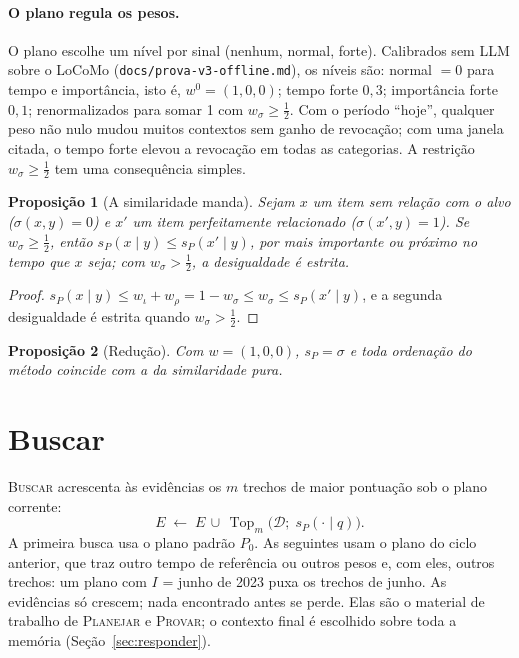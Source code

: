 \documentclass[11pt]{article}
\theoremstyle{definition}
\theoremstyle{plain}
\newtheorem{proposicao}{Proposição}
\newcommand{\op}[1]{\textsc{#1}}
\newcommand{\D}{\mathcal{D}}          %
\newcommand{\Top}{\operatorname{Top}}
\begin{document}
\paragraph{O plano regula os pesos.} O plano escolhe um nível por sinal
(nenhum, normal, forte). Calibrados sem LLM sobre o LoCoMo
(\texttt{docs/prova-v3-offline.md}), os níveis são: normal $=0$ para tempo e
importância, isto é, $w^0=(1,0,0)$; tempo forte $0{,}3$; importância forte
$0{,}1$; renormalizados para somar 1 com $w_\sigma\ge\frac12$. Com o período
``hoje'', qualquer peso não nulo mudou muitos contextos sem ganho de
revocação; com uma janela citada, o tempo forte elevou a revocação em todas as
categorias. A restrição $w_\sigma\ge\frac12$ tem uma consequência simples.

\begin{proposicao}[A similaridade manda]
\label{prop:sim}
Sejam $x$ um item sem relação com o alvo ($\sigma(x,y)=0$) e $x'$ um item
perfeitamente relacionado ($\sigma(x',y)=1$). Se $w_\sigma\ge\frac12$, então
$s_P(x\mid y)\le s_P(x'\mid y)$, por mais importante ou próximo no tempo que
$x$ seja; com $w_\sigma>\frac12$, a desigualdade é estrita.
\end{proposicao}
\begin{proof}
$s_P(x\mid y)\le w_\iota+w_\rho=1-w_\sigma\le w_\sigma\le s_P(x'\mid y)$,
e a segunda desigualdade é estrita quando $w_\sigma>\frac12$.
\end{proof}

\begin{proposicao}[Redução]
\label{prop:reducao}
Com $w=(1,0,0)$, $s_P=\sigma$ e toda ordenação do método coincide com a da
similaridade pura.
\end{proposicao}

\section{Buscar}
\label{sec:buscar}

\op{Buscar} acrescenta às evidências os $m$ trechos de maior pontuação sob o
plano corrente:
\begin{equation}
\label{eq:buscar}
E\;\leftarrow\;E\,\cup\,\Top_m\big(\D;\;s_P(\cdot\mid q)\big).
\end{equation}
A primeira busca usa o plano padrão $P_0$. As seguintes usam o plano do ciclo
anterior, que traz outro tempo de referência ou outros pesos e, com eles,
outros trechos: um plano com $I$ = junho de 2023 puxa os trechos de junho. As
evidências só crescem; nada encontrado antes se perde. Elas são o material de
trabalho de \op{Planejar} e \op{Provar}; o contexto final é escolhido sobre
toda a memória (Seção~\ref{sec:responder}).
\end{document}
